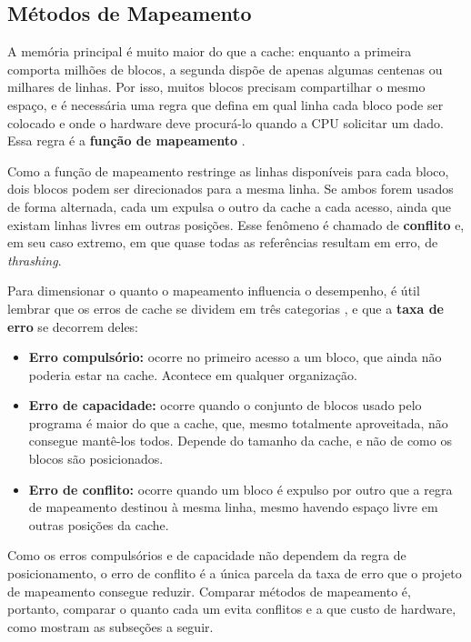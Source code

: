 \documentclass[12pt]{article}
\begin{document}
\subsection{Métodos de Mapeamento}

A memória principal é muito maior do que a cache: enquanto a primeira
comporta milhões de blocos, a segunda dispõe de apenas algumas centenas
ou milhares de linhas. Por isso, muitos blocos precisam compartilhar o
mesmo espaço, e é necessária uma regra que defina em qual linha cada
bloco pode ser colocado e onde o hardware deve procurá-lo quando a CPU
solicitar um dado. Essa regra é a \textbf{função de mapeamento} \cite{stallings2017}.

Como a função de mapeamento restringe as linhas disponíveis para cada
bloco, dois blocos podem ser direcionados para a mesma linha. Se ambos
forem usados de forma alternada, cada um expulsa o outro da cache a cada
acesso, ainda que existam linhas livres em outras posições. Esse
fenômeno é chamado de \textbf{conflito} e, em seu caso extremo, em que
quase todas as referências resultam em erro, de \textit{thrashing}.

Para dimensionar o quanto o mapeamento influencia o desempenho, é útil
lembrar que os erros de cache se dividem em três categorias
\cite{hill1989}, e que a \textbf{taxa de erro} se decorrem deles:

\begin{itemize}
  \renewcommand{\labelitemi}{$\triangleright$}
  \setlength{\itemsep}{3pt}

  \item \textbf{Erro compulsório:} ocorre no primeiro acesso a um bloco,
  que ainda não poderia estar na cache. Acontece em qualquer organização.

  \item \textbf{Erro de capacidade:} ocorre quando o conjunto de blocos
  usado pelo programa é maior do que a cache, que, mesmo totalmente
  aproveitada, não consegue mantê-los todos. Depende do tamanho da
  cache, e não de como os blocos são posicionados.

  \item \textbf{Erro de conflito:} ocorre quando um bloco é expulso por
  outro que a regra de mapeamento destinou à mesma linha, mesmo havendo
  espaço livre em outras posições da cache.

\end{itemize}

Como os erros compulsórios e de capacidade não dependem da regra de
posicionamento, o erro de conflito é a única parcela da taxa de erro que
o projeto de mapeamento consegue reduzir. Comparar métodos de mapeamento
é, portanto, comparar o quanto cada um evita conflitos e a que custo de
hardware, como mostram as subseções a seguir.
\end{document}
